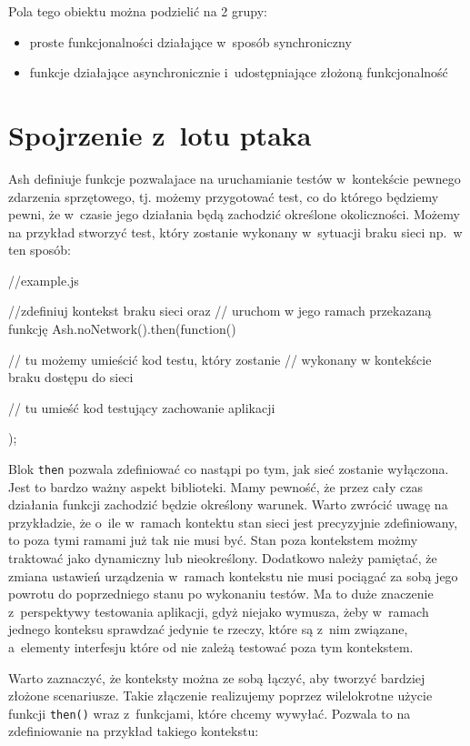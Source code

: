 \documentclass[brudnopis]{xmgr}
\begin{document}
Pola tego obiektu można podzielić na 2 grupy:  
\begin{itemize}
  \item proste funkcjonalności działające w~sposób synchroniczny
  \item funkcje działające asynchronicznie i~udostępniające złożoną funkcjonalność
\end{itemize}

\section{Spojrzenie z~lotu ptaka}

Ash definiuje funkcje pozwalajace na uruchamianie testów w~kontekście pewnego zdarzenia sprzętowego, tj. możemy przygotować test, co do którego będziemy pewni, że w~czasie jego działania będą zachodzić określone okoliczności. Możemy na przykład stworzyć test, który zostanie wykonany w~sytuacji braku sieci np.~w ten sposób:

\begin{javascriptcode}
  //example.js

  //zdefiniuj kontekst braku sieci oraz 
  //  uruchom w jego ramach przekazaną funkcję
  Ash.noNetwork().then(function(){
    //  tu możemy umieścić kod testu, który zostanie 
    //    wykonany w kontekście braku dostępu do sieci 

    // tu umieść kod testujący zachowanie aplikacji  
  });
\end{javascriptcode}

Blok \texttt{then} pozwala zdefiniować co nastąpi po tym, jak sieć zostanie wyłączona. Jest to bardzo ważny aspekt biblioteki. Mamy pewność, że przez cały czas działania funkcji zachodzić będzie określony warunek. Warto zwrócić uwagę na przykładzie, że o~ile w~ramach kontektu stan sieci jest precyzyjnie zdefiniowany, to poza tymi ramami już tak nie musi być. Stan poza kontekstem możmy traktować jako dynamiczny lub nieokreślony. Dodatkowo należy pamiętać, że zmiana ustawień urządzenia w~ramach kontekstu nie musi pociągać za sobą jego powrotu do poprzedniego stanu po wykonaniu testów. Ma to duże znaczenie z~perspektywy testowania aplikacji, gdyż niejako wymusza, żeby w~ramach jednego konteksu sprawdzać jedynie te rzeczy, które są z~nim związane, a~elementy interfesju które od nie zależą testować poza tym kontekstem.

Warto zaznaczyć, że konteksty można ze sobą łączyć, aby tworzyć bardziej złożone scenariusze. Takie złączenie realizujemy poprzez wilelokrotne użycie funkcji \texttt{then()} wraz z~funkcjami, które chcemy wywyłać. Pozwala to na zdefiniowanie na przykład takiego kontekstu:
\end{document}
